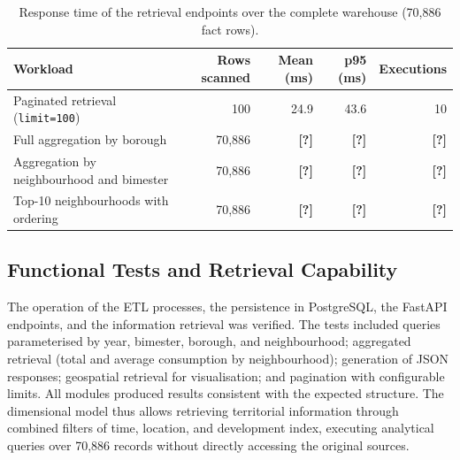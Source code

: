 \documentclass[runningheads]{llncs}
\renewcommand{\_}{\origunderscore\allowbreak}
\newif\ifshowchanges
\newcommand{\new}[1]{\ifshowchanges\textcolor{chg}{#1}\else#1\fi}
\newcommand{\fillin}[1]{\textcolor{todo}{\textbf{[#1]}}}
\begin{document}
\begin{table}[tbp]
\centering
\caption{\new{Response time of the retrieval endpoints over the complete
warehouse (70,886 fact rows).}}
\label{tab:api_perf}
{\ifshowchanges\color{chg}\fi
\footnotesize
\begin{tabularx}{\textwidth}{@{}Yrrrr@{}}
\toprule
\textbf{Workload} & \textbf{Rows scanned} & \textbf{Mean (ms)} & \textbf{p95 (ms)} & \textbf{Executions} \\
\midrule
Paginated retrieval (\texttt{limit{=}100}) & 100 & 24.9 & 43.6 & 10 \\
Full aggregation by borough & 70,886 & \fillin{?} & \fillin{?} & \fillin{?} \\
Aggregation by neighbourhood and bimester & 70,886 & \fillin{?} & \fillin{?} & \fillin{?} \\
Top-10 neighbourhoods with ordering & 70,886 & \fillin{?} & \fillin{?} & \fillin{?} \\
\bottomrule
\end{tabularx}
}
\end{table}

\subsection{Functional Tests and Retrieval Capability}

The operation of the ETL processes, the persistence in PostgreSQL, the FastAPI
endpoints, and the information retrieval was verified. The tests included queries
parameterised by year, bimester, borough, and neighbourhood; aggregated retrieval
(total and average consumption by neighbourhood); generation of JSON responses;
geospatial retrieval for visualisation; and pagination with configurable limits.
All modules produced results consistent with the expected structure.
The dimensional model thus allows retrieving territorial information through
combined filters of time, location, and development index, executing analytical
queries over 70,886 records without directly accessing the original sources.
\end{document}

